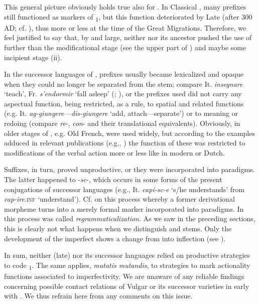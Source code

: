 \documentclass[output=paper]{langsci/langscibook}
\begin{document}
This general picture obviously holds true also for . In Classical , many prefixes still functioned as markers of \textsubscript{1}, but this function deteriorated by Late  (after 300 AD; cf. \citealt{Haverling2003}), thus more or less at the time of the Great Migrations. Therefore, we feel justified to say that, by and large, neither  nor its ancestor  pushed the use of  further than the modificational stage (see the upper part of ) and maybe some incipient stage (ii).

In the  successor languages of , prefixes usually became lexicalized and opaque when they could no longer be separated from the stem; compare It. \textit{in{\textbar}segnare} ‘teach’, Fr. \textit{s’en{\textbar}dormir} ‘fall asleep’ (\citealt[125]{Haverling2003}; \citealt[12]{Cuzzolin2006}), or the prefixes used did not carry any aspectual function, being restricted, as a rule, to spatial and related functions (e.g. It. \textit{ag-giungere—dis-giungere} ‘add, attach—separate’) or to  meaning or redoing (compare  \textit{re}-, \textit{con}- and their translational equivalents). Obviously, in older stages of , e.g. Old French,  were used widely, but according to the examples adduced in relevant publications (e.g., \citealt{Dufresne2003}) the function of these  was restricted to modifications of the verbal action more or less like in modern  or Dutch.


Suffixes, in turn, proved unproductive, or they were incorporated into  paradigms. The latter happened to  -\textit{sc}-, which occurs in some forms of the present  conjugations of  successor languages (e.g., It. \textit{capi-sc-e} ‘s/he understands’ from \textit{cap-ire}.\textsc{inf} ‘understand’). Cf. \citet{Allen1995} on this process whereby a former derivational morpheme turns into a merely formal marker incorporated into  paradigms. In \citet{Greenberg1991} this process was called \textit{regrammaticalization}. As we saw in the preceding sections, this is clearly not what happens when we distinguish  and  stems. Only the development of the  imperfect shows a change from  into inflection (see ).

In sum, neither (late)  nor its  successor languages relied on productive  strategies to code \textsubscript{1}. The same applies, \textit{mutatis mutandis}, to  strategies to mark actionality functions associated to imperfectivity. We are unaware of any reliable findings concerning possible contact relations of Vulgar  or its successor varieties in early  with . We thus refrain here from any comments on this issue.
\end{document}
